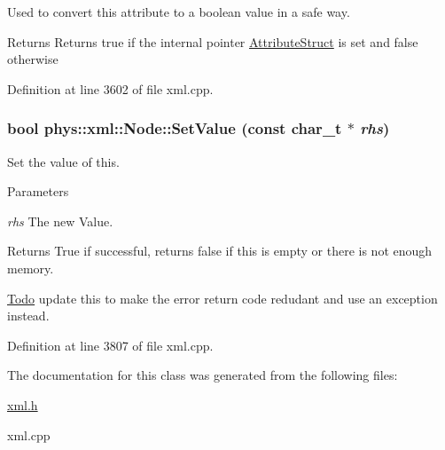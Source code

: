 Used to convert this attribute to a boolean value in a safe way. 

\begin{DoxyReturn}{Returns}
Returns true if the internal pointer \hyperlink{structphys_1_1xml_1_1AttributeStruct}{AttributeStruct} is set and false otherwise 
\end{DoxyReturn}


Definition at line 3602 of file xml.cpp.

\hypertarget{classphys_1_1xml_1_1Node_a50ff9948dac721339561ed3442fb7034}{
\subsubsection[{SetValue}]{\setlength{\rightskip}{0pt plus 5cm}bool phys::xml::Node::SetValue (const {\bf char\_\-t} $\ast$ {\em rhs})}}
\label{d7/d0a/classphys_1_1xml_1_1Node_a50ff9948dac721339561ed3442fb7034}


Set the value of this. 


\begin{DoxyParams}{Parameters}
\item[{\em rhs}]The new Value. \end{DoxyParams}
\begin{DoxyReturn}{Returns}
True if successful, returns false if this is empty or there is not enough memory. 
\end{DoxyReturn}
\begin{Desc}
\item[\hyperlink{todo__todo000038}{Todo}]update this to make the error return code redudant and use an exception instead. \end{Desc}


Definition at line 3807 of file xml.cpp.



The documentation for this class was generated from the following files:\begin{DoxyCompactItemize}
\item 
\hyperlink{xml_8h}{xml.h}\item 
xml.cpp\end{DoxyCompactItemize}
